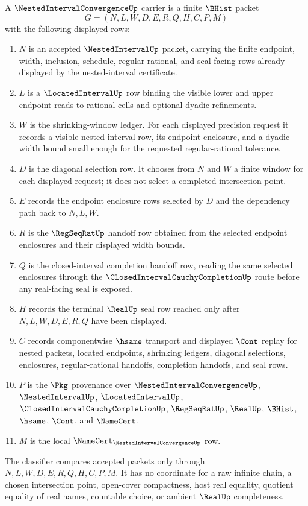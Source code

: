 \begin{definition}
\label{def:nested-interval-convergence-carrier}
A $\NestedIntervalConvergenceUp$ carrier is a finite $\BHist$ packet
$$
G=(N,L,W,D,E,R,Q,H,C,P,M)
$$
with the following displayed rows:
\begin{enumerate}
\item $N$ is an accepted $\NestedIntervalUp$ packet, carrying the finite endpoint, width, inclusion, schedule, regular-rational, and seal-facing rows already displayed by the nested-interval certificate.
\item $L$ is a $\LocatedIntervalUp$ row binding the visible lower and upper endpoint reads to rational cells and optional dyadic refinements.
\item $W$ is the shrinking-window ledger. For each displayed precision request it records a visible nested interval row, its endpoint enclosure, and a dyadic width bound small enough for the requested regular-rational tolerance.
\item $D$ is the diagonal selection row. It chooses from $N$ and $W$ a finite window for each displayed request; it does not select a completed intersection point.
\item $E$ records the endpoint enclosure rows selected by $D$ and the dependency path back to $N,L,W$.
\item $R$ is the $\RegSeqRatUp$ handoff row obtained from the selected endpoint enclosures and their displayed width bounds.
\item $Q$ is the closed-interval completion handoff row, reading the same selected enclosures through the $\ClosedIntervalCauchyCompletionUp$ route before any real-facing seal is exposed.
\item $H$ records the terminal $\RealUp$ seal row reached only after $N,L,W,D,E,R,Q$ have been displayed.
\item $C$ records componentwise $\hsame$ transport and displayed $\Cont$ replay for nested packets, located endpoints, shrinking ledgers, diagonal selections, enclosures, regular-rational handoffs, completion handoffs, and seal rows.
\item $P$ is the $\Pkg$ provenance over $\NestedIntervalConvergenceUp$, $\NestedIntervalUp$, $\LocatedIntervalUp$, $\ClosedIntervalCauchyCompletionUp$, $\RegSeqRatUp$, $\RealUp$, $\BHist$, $\hsame$, $\Cont$, and $\NameCert$.
\item $M$ is the local $\NameCert_{\NestedIntervalConvergenceUp}$ row.
\end{enumerate}
The classifier compares accepted packets only through $N,L,W,D,E,R,Q,H,C,P,M$. It has no coordinate for a raw infinite chain, a chosen intersection point, open-cover compactness, host real equality, quotient equality of real names, countable choice, or ambient $\RealUp$ completeness.
\end{definition}


